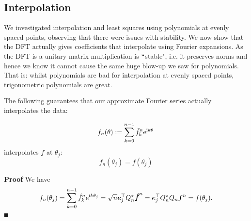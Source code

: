 \subsection{Interpolation}
We investigated  interpolation and least squares using polynomials at evenly spaced points, observing that there were issues with stability. We now show that the DFT actually gives coefficients that interpolate using Fourier expansions. As the DFT is a unitary matrix multiplication is \ensuremath{\ldq}stable", i.e. it preserves norms and hence we know it cannot cause the same huge blow-up we saw for polynomials. That is: whilst polynomials are bad for interpolation at evenly spaced points, trigonometric polynomials are great. 

The following guarantees that our approximate Fourier series actually interpolates the data:

\begin{corollary}[Interpolation]
\[
f_n(\ensuremath{\theta}) := \ensuremath{\sum}_{k=0}^{n-1} \hat f_k^n {\rm e}^{{\rm i} k \ensuremath{\theta}}
\]
interpolates $f$ at $\ensuremath{\theta}_j$:
\[
f_n(\ensuremath{\theta}_j) = f(\ensuremath{\theta}_j)
\]
\end{corollary}
\textbf{Proof} We have
\[
f_n(\theta_j) = \sum_{k=0}^{n-1} \hat f_k^n {\rm e}^{{\rm i} k \theta_j} = \sqrt n \bm{{\mbox{\boldmath$e$\unboldmath}}}_j^\top Q_n^\star {\mbox{\boldmath$\hat f$\unboldmath}}^n = \bm{{\mbox{\boldmath$e$\unboldmath}}}_j^\top Q_n^\star Q_n \bm{{\mbox{\boldmath$f$\unboldmath}}}^n = f(\theta_j).
\]
\ensuremath{\QED}



